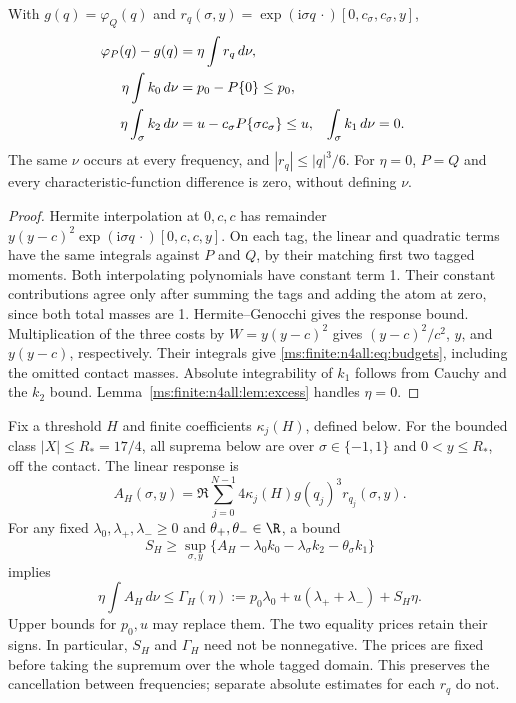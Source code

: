 \begin{lemma}\label{ms:finite:n4all:lem:common-measure}
With $g(q)=\varphi_Q(q)$ and
$r_q(\sigma,y)=\exp(\mathrm i\sigma q\,\cdot)[0,c_\sigma,c_\sigma,y]$,
\begin{align}
 \varphi_P(q)-g(q)&=\eta\int r_q\,d\nu,\notag\\
 \eta\int k_0\,d\nu&=p_0-P\{0\}\le p_0,\notag\\
 \eta\int_{\sigma}k_2\,d\nu&=u-c_\sigma P\{\sigma c_\sigma\}\le u,
 &\int_{\sigma}k_1\,d\nu&=0.\label{ms:finite:n4all:eq:budgets}
\end{align}
The same $\nu$ occurs at every frequency, and $|r_q|\le |q|^3/6$.
For $\eta=0$, $P=Q$ and every characteristic-function difference is
zero, without defining $\nu$.
\end{lemma}
\begin{proof}
Hermite interpolation at $0,c,c$ has remainder
$y(y-c)^2\exp(\mathrm i\sigma q\,\cdot)[0,c,c,y]$.
On each tag, the linear and quadratic terms have the same integrals
against $P$ and $Q$, by their matching first two tagged moments.
Both interpolating polynomials have constant term 1. Their constant
contributions agree only after summing the tags and adding the atom
at zero, since both total masses are 1.
Hermite--Genocchi gives the response bound. Multiplication of the
three costs by $W=y(y-c)^2$ gives
$(y-c)^2/c^2$, $y$, and $y(y-c)$, respectively.
Their integrals give \eqref{ms:finite:n4all:eq:budgets}, including the omitted
contact masses. Absolute integrability of $k_1$ follows from Cauchy
and the $k_2$ bound. Lemma~\ref{ms:finite:n4all:lem:excess} handles $\eta=0$.
\end{proof}

Fix a threshold $H$ and finite coefficients $\kappa_j(H)$, defined
below. For the bounded class $|X|\le R_*=17/4$, all suprema below
are over $\sigma\in\{-1,1\}$ and $0<y\le R_*$, off the contact.
The linear response is
\[
 A_H(\sigma,y)=\Re\sum_{j=0}^{N-1}
        4\kappa_j(H)g(q_j)^3r_{q_j}(\sigma,y).
\]
For any fixed $\lambda_0,\lambda_+,\lambda_-\ge0$ and
$\theta_+,\theta_-\in\R$, a bound
\begin{equation}\label{ms:finite:n4all:eq:priced-supremum}
 S_H\ge\sup_{\sigma,y}
 \{A_H-\lambda_0k_0-\lambda_\sigma k_2-\theta_\sigma k_1\}
\end{equation}
implies
\begin{equation}\label{ms:finite:n4all:eq:gamma}
 \eta\int A_H\,d\nu\le
 \Gamma_H(\eta):=p_0\lambda_0+u(\lambda_++\lambda_-)+S_H\eta.
\end{equation}
Upper bounds for $p_0,u$ may replace them. The two equality prices
retain their signs. In particular, $S_H$ and $\Gamma_H$ need not be
nonnegative. The prices are fixed before taking the supremum over
the whole tagged domain. This preserves the cancellation between
frequencies; separate absolute estimates for each $r_q$ do not.

